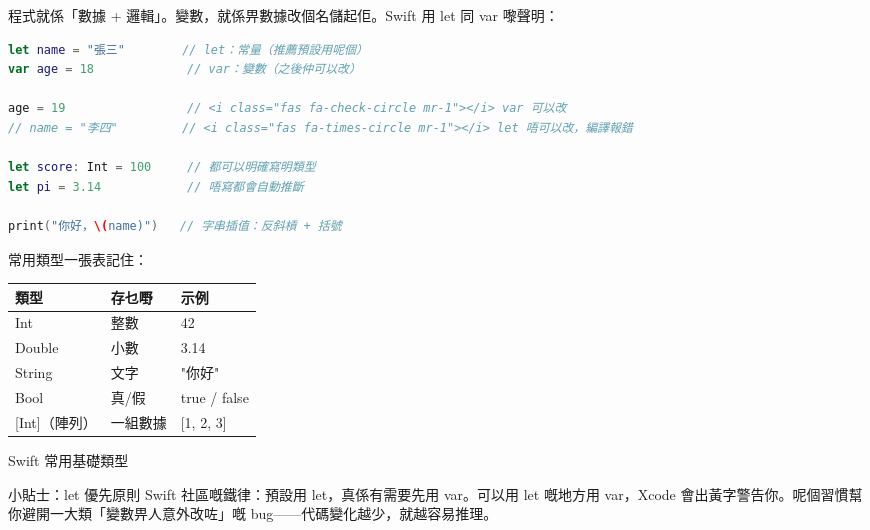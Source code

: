


程式就係「數據 + 邏輯」。變數，就係畀數據改個名儲起佢。Swift 用 let 同 var 嚟聲明：

\begin{lstlisting}[language=Swift]
let name = "張三"        // let：常量（推薦預設用呢個）
var age = 18             // var：變數（之後仲可以改）

age = 19                 // <i class="fas fa-check-circle mr-1"></i> var 可以改
// name = "李四"         // <i class="fas fa-times-circle mr-1"></i> let 唔可以改，編譯報錯

let score: Int = 100     // 都可以明確寫明類型
let pi = 3.14            // 唔寫都會自動推斷

print("你好，\(name)")   // 字串插值：反斜槓 + 括號
\end{lstlisting}

常用類型一張表記住：

\begin{center}
\begin{tabularx}{\linewidth}{|X|X|X|}
\hline
\textbf{類型} & \textbf{存乜嘢} & \textbf{示例} \tabularnewline
\hline
Int & 整數 & 42 \tabularnewline
Double & 小數 & 3.14 \tabularnewline
String & 文字 & "你好" \tabularnewline
Bool & 真/假 & true / false \tabularnewline
{}[Int]（陣列） & 一組數據 & {}[1, 2, 3] \tabularnewline
\hline
\end{tabularx}
\end{center}

\begin{center}\small\color{gray}Swift 常用基礎類型\end{center}

\begin{tcbinfo}{小貼士：let 優先原則}
Swift 社區嘅鐵律：預設用 let，真係有需要先用 var。可以用 let 嘅地方用 var，Xcode 會出黃字警告你。呢個習慣幫你避開一大類「變數畀人意外改咗」嘅 bug——代碼變化越少，就越容易推理。

\end{tcbinfo}


